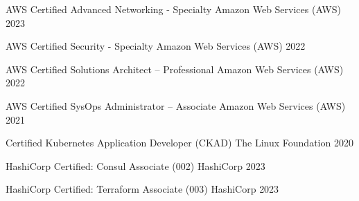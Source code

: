 

\begin{cvhonors}

  \cvhonor
    {AWS Certified Advanced Networking - Specialty} %
    {Amazon Web Services (AWS)} %
    {} %
    {2023} %

  \cvhonor
    {AWS Certified Security - Specialty} %
    {Amazon Web Services (AWS)} %
    {} %
    {2022} %

  \cvhonor
    {AWS Certified Solutions Architect – Professional} %
    {Amazon Web Services (AWS)} %
    {} %
    {2022} %

  \cvhonor
    {AWS Certified SysOps Administrator – Associate} %
    {Amazon Web Services (AWS)} %
    {} %
    {2021} %

  \cvhonor
    {Certified Kubernetes Application Developer (CKAD)} %
    {The Linux Foundation} %
    {} %
    {2020} %

  \cvhonor
    {HashiCorp Certified: Consul Associate (002)} %
    {HashiCorp} %
    {} %
    {2023} %

  \cvhonor
    {HashiCorp Certified: Terraform Associate (003)} %
    {HashiCorp} %
    {} %
    {2023} %

\end{cvhonors}
